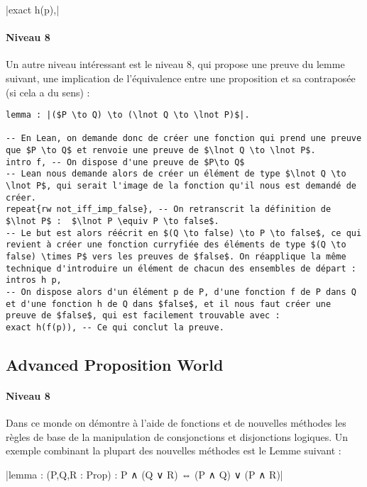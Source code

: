 |exact h(p),| 

\paragraph{Niveau 8}
Un autre niveau intéressant est le niveau 8, qui propose une preuve du lemme suivant, une implication de l'équivalence entre une proposition et sa contraposée (si cela a du sens) : 

\begin{verbatim}
lemma : |($P \to Q) \to (\lnot Q \to \lnot P)$|. 

-- En Lean, on demande donc de créer une fonction qui prend une preuve que $P \to Q$ et renvoie une preuve de $\lnot Q \to \lnot P$.
intro f, -- On dispose d'une preuve de $P\to Q$ 
-- Lean nous demande alors de créer un élément de type $\lnot Q \to \lnot P$, qui serait l'image de la fonction qu'il nous est demandé de créer.
repeat{rw not_iff_imp_false}, -- On retranscrit la définition de $\lnot P$ :  $\lnot P \equiv P \to false$.
-- Le but est alors réécrit en $(Q \to false) \to P \to false$, ce qui revient à créer une fonction curryfiée des éléments de type $(Q \to false) \times P$ vers les preuves de $false$. On réapplique la même technique d'introduire un élément de chacun des ensembles de départ : 
intros h p,
-- On dispose alors d'un élément p de P, d'une fonction f de P dans Q et d'une fonction h de Q dans $false$, et il nous faut créer une preuve de $false$, qui est facilement trouvable avec : 
exact h(f(p)), -- Ce qui conclut la preuve. 
\end{verbatim}


\subsection{Advanced Proposition World}
\paragraph{Niveau 8}
Dans ce monde on démontre à l'aide de fonctions et de nouvelles méthodes les règles de base de la manipulation de consjonctions et disjonctions logiques. Un exemple combinant la plupart des nouvelles méthodes est le Lemme suivant : 


|lemma : (P,Q,R : Prop) : P ∧ (Q ∨ R) ⇔ (P ∧ Q) ∨ (P ∧ R)|

